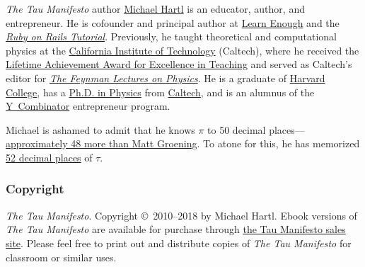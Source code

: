 \emph{The Tau Manifesto} author \href{https://www.michaelhartl.com/}{Michael Hartl} is an educator, author, and entrepreneur. He is cofounder and principal author at \href{https://www.learnenough.com}{Learn Enough} and the \href{https://www.railstutorial.org/}{\emph{Ruby on Rails Tutorial}}. Previously, he taught theoretical and computational physics at the \href{https://www.caltech.edu/}{California Institute of Technology} (Caltech), where he received the \href{https://www.michaelhartl.com/ascit/awards2000.html}{Lifetime Achievement Award for Excellence in Teaching} and served as Caltech's editor for \href{https://www.feynmanlectures.caltech.edu/}{\emph{The Feynman Lectures on Physics}}. He is a graduate of \href{https://college.harvard.edu/}{Harvard College}, has a \href{https://thesis.library.caltech.edu/1940/}{Ph.D. in Physics} from \href{https://www.caltech.edu/}{Caltech}, and is an alumnus of the \href{https://ycombinator.com/}{Y~Combinator} entrepreneur program.

Michael is ashamed to admit that he knows $\pi$ to 50 decimal places---\href{\#fig-futurama_video}{ap\-prox\-imately 48 more than Matt Groening}. To atone for this, he has memorized \href{https://www.wolframalpha.com/input/?i=N[2+Pi,+53]}{52 decimal places} of $\tau$.

    \subsubsection{Copyright} %
    \label{sec:copyright_and_license}

    \emph{The Tau Manifesto}. Copyright \copyright\ 2010--2018 by Michael Hartl. Ebook versions of \emph{The Tau Manifesto} are available for purchase through \href{https://sales.tauday.com/}{the Tau Manifesto sales site}. Please feel free to print out and distribute copies of \emph{The Tau Manifesto} for classroom or similar uses.

